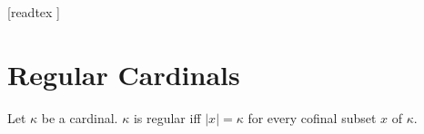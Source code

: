 \documentclass[10pt]{article}
\begin{document}
  \begin{imports}
    \begin{forthel}
      [readtex ]
    \end{forthel}
  \end{imports}


  \section*{Regular Cardinals}

  \begin{forthel}
    \begin{definition}
      Let $\kappa$ be a cardinal.
      $\kappa$ is regular iff $|x| = \kappa$ for every cofinal subset $x$ of $\kappa$.
    \end{definition}
  \end{forthel}
\end{document}
